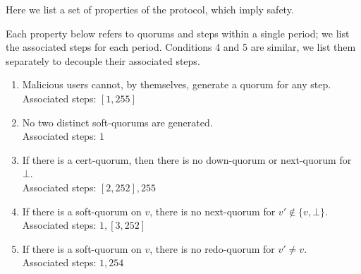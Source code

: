 \documentclass[../main.tex]{subfiles}
\begin{document}
Here we list a set of properties of the protocol, which imply safety. 
\iffalse
These will be further discussed in Section~\ref{section:ParameterComputations}.
\fi
Each property below refers to quorums and steps within a single period; we list the associated steps for each period. 
Conditions 4 and 5 are similar, we list them separately to decouple their associated steps.
\begin{enumerate}

\item Malicious users cannot, by themselves, generate a quorum for any step.\\
Associated steps: $[1,255]$

\item No two distinct soft-quorums are generated.\\
Associated steps: $1$

\item If there is a cert-quorum, then there is no down-quorum or next-quorum for $\bot$.\\
Associated steps: $[2,252],255$

\item If there is a soft-quorum on $v$, there is no next-quorum for $v' \notin \{v,\bot\}$.\\
Associated steps: $1,[3,252]$

\item If there is a soft-quorum on $v$, there is no redo-quorum for $v' \neq v$.\\
Associated steps: $1,254$

\end{enumerate}
\end{document}
